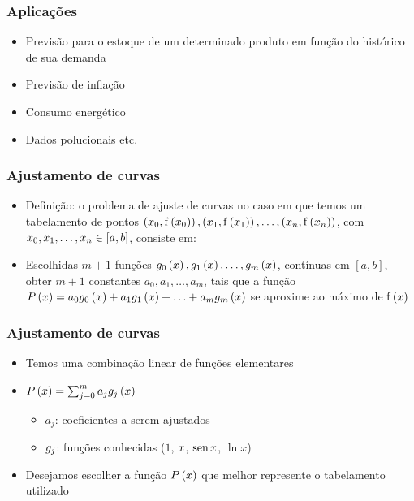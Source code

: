 \begin{frame}
\frametitle{Aplicações}

\begin{itemize}[<+->]
  \item Previsão para o estoque de um determinado produto em função do histórico de sua demanda

  \item Previsão de inflação
  \item Consumo energético
  \item Dados polucionais etc.
\end{itemize}
\end{frame}

\begin{frame}
\frametitle{Ajustamento de curvas}

\begin{itemize}
  \item Definição: o problema de ajuste de curvas no caso em que temos um tabelamento de pontos 
$\left(x_0, \mathrm{f}\left(x_0\right)\right), \left(x_1, \mathrm{f}\left(x_1\right) \right), \ldots, \left(x_n, \mathrm{f}\left(x_n\right) \right) $, com $x_0, x_1, \ldots, x_n \in [a,b]$, consiste em:
  
  \item Escolhidas $m+1$ funções 
$g_0\left(x\right), g_1\left(x\right), \ldots, g_m\left(x\right) $, contínuas em $[a,b]$, obter $m+1$ constantes $a_0, a_1, \ldots, a_m$, tais que a função $P\left(x \right) = a_0 g_0\left(x\right) + a_1 g_1 \left(x\right) + \ldots + a_m g_m \left(x\right) $ se aproxime ao máximo de $\mathrm{f}\left(x\right) $
\end{itemize}
\end{frame}

\begin{frame}
\frametitle{Ajustamento de curvas}

\begin{itemize}
  \item Temos uma combinação linear de funções elementares
  \item $P\left(x\right) = \sum_{j=0}^m a_j g_j \left(x\right) $
    \begin{itemize}
      \item $a_j$: coeficientes a serem ajustados
      \item $g_j$: funções conhecidas ($1$, $x$, $\operatorname{\text{sen}} x$, $\ln x$)
    \end{itemize}
  \item Desejamos escolher a função $P\left(x\right)$ que melhor represente o tabelamento utilizado
\end{itemize}
\end{frame}

